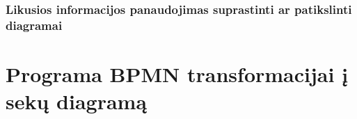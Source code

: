 \documentclass{VUMIFInfBakalaurinis}
\begin{document}

\subsubsection{Likusios informacijos panaudojimas suprastinti ar patikslinti diagramai}


\section{Programa \textbf{BPMN} transformacijai į \textbf{sekų diagramą}}   





\printbibliography[heading=bibintoc] %


\appendix  %


\end{document}
